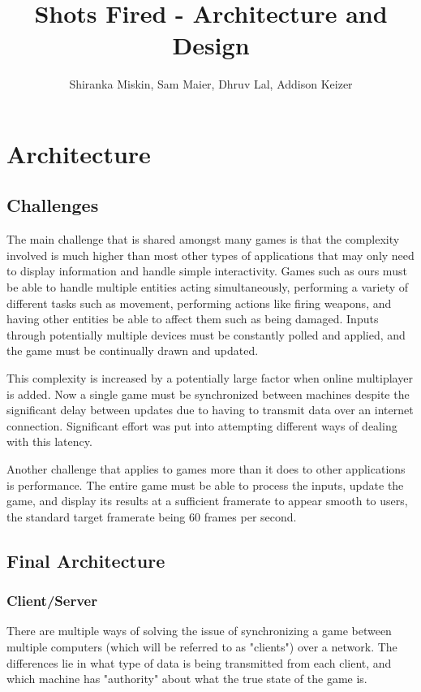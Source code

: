 \documentclass[12pt]{report}
\author{Shiranka Miskin, Sam Maier, Dhruv Lal, Addison Keizer}
\title{Shots Fired - Architecture and Design}
\begin{document}
\maketitle

\tableofcontents
\chapter{Architecture}
\section{Challenges}

The main challenge that is shared amongst many games is that the complexity
involved is much higher than most other types of applications that may only need
to display information and handle simple interactivity.  Games such as ours must
be able to handle multiple entities acting simultaneously, performing a variety
of different tasks such as movement, performing actions like firing weapons, and
having other entities be able to affect them such as being damaged.  Inputs
through potentially multiple devices must be constantly polled and applied, and
the game must be continually drawn and updated.

This complexity is increased by a potentially large factor when online
multiplayer is added. Now a single game must be synchronized between machines
despite the significant delay between updates due to having to transmit data
over an internet connection.  Significant effort was put into attempting
different ways of dealing with this latency.

Another challenge that applies to games more than it does to other applications
is performance.  The entire game must be able to process the inputs, update the
game, and display its results at a sufficient framerate to appear smooth to
users, the standard target framerate being 60 frames per second.

\section{Final Architecture}
\subsection{Client/Server}
There are multiple ways of solving the issue of synchronizing a game between
multiple computers (which will be referred to as "clients") over a network.  The
differences lie in what type of data is being transmitted from each client, and
which machine has "authority" about what the true state of the game is.
\end{document}
